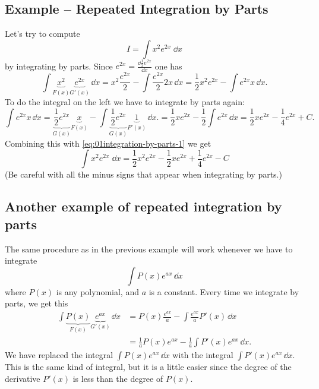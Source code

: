 \subsection{Example -- Repeated Integration by Parts} %
Let's try to compute
\[
I = \int x^2 e^{2x}\;\dd x
\]
by integrating by parts.  Since $e^{2x}=\frac{\dd\frac12e^{2x} }{\dd x}$ one has
\begin{equation}
  \int \underbrace{x^{2}}_{F(x)}\underbrace{e^{2x}}_{G'(x)}\,\dd x
  =  x^{2}\frac{e^{2x}}{2}-\int \frac{e^{2x}}{2}2x\,\dd x
  =  \frac12x^{2}e^{2x}-\int e^{2x}x\,\dd x.
  \label{eq:01integration-by-parts-1}
\end{equation}
To do the integral on the left we have to integrate by parts again:
\[
\int e^{2x}x\,\dd x = \underbrace{\frac12 e^{2x}}_{G(x)} \underbrace{x}_{F(x)} -
\int \underbrace{\frac12 e^{2x}}_{G(x)} \underbrace{1}_{F'(x)}\,\dd x.  =
\frac12 xe^{2x} - \frac12 \int e^{2x}\,\dd x = \frac12 xe^{2x} - \frac14 e^{2x}
+C.
\]
Combining this with \eqref{eq:01integration-by-parts-1} we get
\[
\int x^2 e^{2x}\;\dd x =
\frac{1}{2}x^{2}e^{2x}-\frac{1}{2}xe^{2x}+\frac{1}{4}e^{2x}-C
\]
(Be careful with all the minus signs that appear when integrating by parts.)

\subsection{Another example of repeated integration by parts} The same procedure %
as in the previous example will work whenever we have to integrate
\[
\int P(x)e^{ax}\,\dd x
\]
where \( P(x) \) is any polynomial, and \( a \) is a constant.  Every time we
integrate by parts, we get this
\begin{align*}
  \int \underbrace{P(x)}_{F(x)}\underbrace{e^{ax}}_{G'(x)}\,\dd x
  & =  P(x)\frac{e^{ax}}{a}-\int \frac{e^{ax}}{a}P'(x)\,\dd x\\
  & = \frac{1}{a}P(x)e^{ax}-\frac{1}{a}\int P'(x)e^{ax}\,\dd x.
\end{align*}
We have replaced the integral \( \int P(x)e^{ax}\,\dd x \) with the integral \(
\int P'(x)e^{ax}\,\dd x \). This is the same kind of integral, but it is a
little easier since the degree of the derivative \( P'(x) \) is less than the
degree of \( P(x) \).

